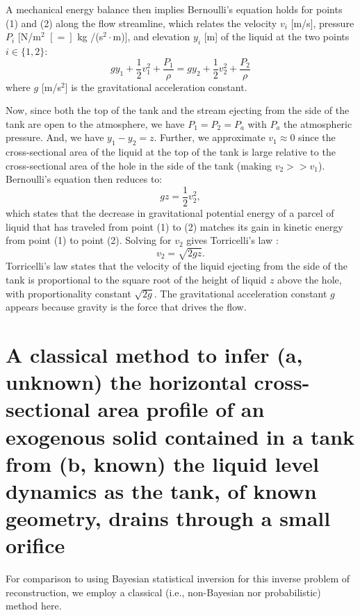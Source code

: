 \documentclass[a4paper,fleqn]{cas-sc}
\begin{document}
	A mechanical energy balance then implies Bernoulli's equation \cite{welty2020fundamentals} holds for points (1) and (2) along the flow streamline, which relates the velocity $v_i$ [m/s], pressure $P_i$ [N/m$^2$ $[=]$ kg /(s$^2\cdot$m)], and elevation $y_i$ [m] of the liquid at the two points $i\in\{1,2\}$:
	\begin{equation}
	g y_1 + \frac{1}{2} v_1^2 + \frac{P_1}{\rho} = gy_2 + \frac{1}{2} v_2^2 + \frac{P_2}{\rho} 
	\end{equation}
	where $g$ [m/s$^2$] is the gravitational acceleration constant. 
	
	Now, since both the top of the tank and the stream ejecting from the side of the tank are open to the atmosphere, we have $P_1=P_2=P_a$ with $P_a$ the atmospheric pressure. And, we have $y_1-y_2=z$. Further, we approximate $v_1\approx 0$ since the cross-sectional area of the liquid at the top of the tank is large relative to the cross-sectional area of the hole in the side of the tank (making $v_2 >> v_1$). Bernoulli's equation then reduces to:
	\begin{equation}
	g z  = \frac{1}{2} v_2^2,
	\end{equation}
	which states that the decrease in gravitational potential energy of a parcel of liquid that has traveled from point (1) to (2) matches its gain in kinetic energy from point (1) to point (2). Solving for $v_2$ gives Torricelli's law \cite{driver1998torricelli}:
	\begin{equation}
	v_2 = \sqrt{2gz}.
	\end{equation}
	Torricelli's law states that the velocity of the liquid ejecting from the side of the tank is proportional to the square root of the height of liquid $z$ above the hole, with proportionality constant $\sqrt{2g}$. The gravitational acceleration constant $g$ appears because gravity is the force that drives the flow.
	
\clearpage
	
\section{
A classical method 
to infer 
(a, unknown) the horizontal cross-sectional area profile of an exogenous solid contained in a tank from 
(b, known) the liquid level dynamics as the tank, of known geometry, drains through a small orifice
} \label{sec:classical}
For comparison to using Bayesian statistical inversion for this inverse problem of reconstruction, we employ a classical (i.e., non-Bayesian nor probabilistic) method here.
\end{document}
